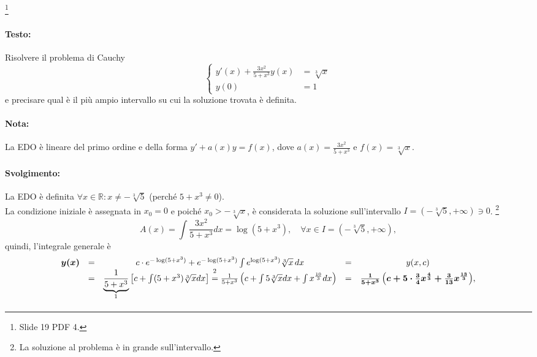 \begin{example}\footnote{Slide 19 PDF 4.}
    \paragraph{Testo:} Risolvere il problema di Cauchy
    \begin{equation*}
        \begin{cases}
            y'(x)+\frac{3x^2}{5+x^3}y(x) &= \sqrt[3]{x}\\
            y(0) &= 1
        \end{cases}
    \end{equation*}
    e precisare qual è il più ampio intervallo su cui la soluzione trovata è definita.
    \paragraph{Nota:} La EDO è lineare del primo ordine e della forma $y'+a(x)y=f(x)$, dove $a(x)=\frac{3x^2}{5+x^3}$ e $f(x) = \sqrt[3]{x}$.
    \paragraph{Svolgimento:} La EDO è definita $\forall x\in\mathbb R : x\neq-\sqrt[3]{5}$ (perché $5+x^3\neq 0$).\\
    La condizione iniziale è assegnata in $x_0=0$ e poiché $x_0>-\sqrt[3]{x}$, è considerata la soluzione sull'intervallo $I=(-\sqrt[3]{5}, +\infty)\ni 0$. \footnote{La soluzione al problema è in grande sull'intervallo.}\\
    \begin{equation*}
        A(x) = \int \frac{3x^2}{5+x^3} dx = \log(5+x^3),\quad \forall x\in I=(-\sqrt[3]{5}, +\infty),
    \end{equation*}
    quindi, l'integrale generale è
    \begin{equation*}
        \begin{matrix}
            \boldsymbol{y(x)} &=& c\cdot e^{-\log(5+x^3)} + e^{-\log(5+x^3)}\int e^{\log(5+x^3)} \sqrt[3]{x}\, dx &=& y(x,c)\\
            &=& \underbrace{\frac{1}{5+x^3}}_{\footnotemark}\left[c+\int (5+x^3)\sqrt[3]{x}dx\right] \overset{\footnotemark}{=} \frac{1}{5+x^3}\left(c+\int 5\sqrt[3]{x}dx+\int x^{\frac{10}{3}} dx\right) &=& \boldsymbol{\frac{1}{5+x^3}\left(c+5\cdot\frac{3}{4}x^{\frac{4}{3}} + \frac{3}{13}x^{\frac{13}{3}}\right)},
        \end{matrix}
    \end{equation*}
    \addtocounter{footnote}{-1}


\end{example}
